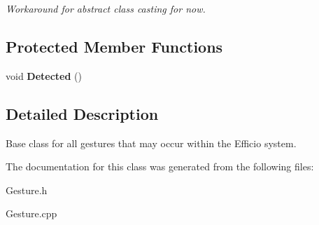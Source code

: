 \begin{DoxyCompactItemize}
\begin{DoxyCompactList}\small\item\em Workaround for abstract class casting for now. \end{DoxyCompactList}\end{DoxyCompactItemize}
\subsection*{Protected Member Functions}
\begin{DoxyCompactItemize}
\item 
void {\bfseries Detected} ()\hypertarget{class_efficio_1_1_input_recognition_1_1_gesture_abc8a2efea87a2d9f950f6912e78d6910}{}\label{class_efficio_1_1_input_recognition_1_1_gesture_abc8a2efea87a2d9f950f6912e78d6910}

\end{DoxyCompactItemize}


\subsection{Detailed Description}
Base class for all gestures that may occur within the Efficio system. 

The documentation for this class was generated from the following files\+:\begin{DoxyCompactItemize}
\item 
Gesture.\+h\item 
Gesture.\+cpp\end{DoxyCompactItemize}
